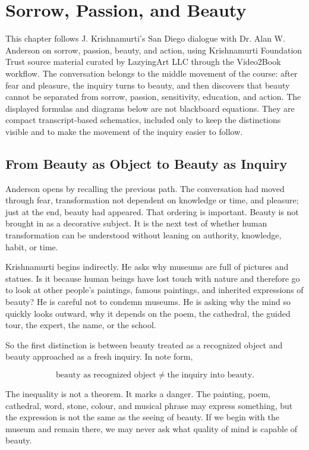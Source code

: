 \chapter{Sorrow, Passion, and Beauty}

This chapter follows J. Krishnamurti's San Diego dialogue with Dr. Alan W. Anderson on sorrow, passion, beauty, and action, using Krishnamurti Foundation Trust source material curated by LazyingArt LLC through the Video2Book workflow. The conversation belongs to the middle movement of the course: after fear and pleasure, the inquiry turns to beauty, and then discovers that beauty cannot be separated from sorrow, passion, sensitivity, education, and action. The displayed formulas and diagrams below are not blackboard equations. They are compact transcript-based schematics, included only to keep the distinctions visible and to make the movement of the inquiry easier to follow.

\section{From Beauty as Object to Beauty as Inquiry}

Anderson opens by recalling the previous path. The conversation had moved through fear, transformation not dependent on knowledge or time, and pleasure; just at the end, beauty had appeared. That ordering is important. Beauty is not brought in as a decorative subject. It is the next test of whether human transformation can be understood without leaning on authority, knowledge, habit, or time.

Krishnamurti begins indirectly. He asks why museums are full of pictures and statues. Is it because human beings have lost touch with nature and therefore go to look at other people's paintings, famous paintings, and inherited expressions of beauty? He is careful not to condemn museums. He is asking why the mind so quickly looks outward, why it depends on the poem, the cathedral, the guided tour, the expert, the name, or the school.

So the first distinction is between beauty treated as a recognized object and beauty approached as a fresh inquiry. In note form,

\begin{equation}
\text{beauty as recognized object}
\neq
\text{the inquiry into beauty}.
\end{equation}

The inequality is not a theorem. It marks a danger. The painting, poem, cathedral, word, stone, colour, and musical phrase may express something, but the expression is not the same as the seeing of beauty. If we begin with the museum and remain there, we may never ask what quality of mind is capable of beauty.

